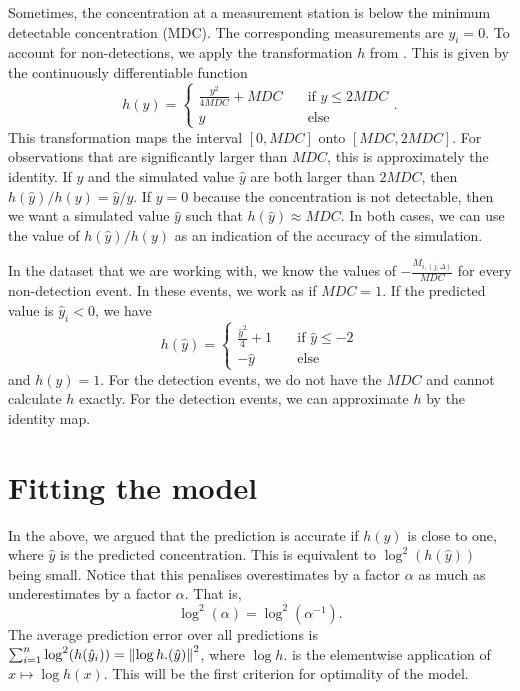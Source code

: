 \documentclass{article}
\begin{document}
Sometimes, the concentration at a measurement station is below the minimum detectable concentration (MDC). The corresponding measurements are $y_i = 0$.
To account for non-detections, we apply the transformation $h$ from \cite{deMeutter2022uncertainty}. This is given by the continuously differentiable function
$$
h(y) = \begin{cases}
    \frac{y^2}{4MDC} + MDC &\quad \text{if } y \le 2MDC \\
    y &\quad \text{else}
\end{cases}
.$$
This transformation maps the interval $[0, MDC]$ onto $[MDC, 2MDC]$. For observations that are significantly larger than $MDC$, this is approximately the identity. If $y$ and the simulated value $\hat{y}$ are both larger than $2MDC$, then $h(\hat{y}) / h(y) = \hat{y} / y$. If $y = 0$ because the concentration is not detectable, then we want a simulated value $\hat{y}$ such that $h(\hat{y}) \approx MDC$. In both cases, we can use the value of $h(\hat{y}) / h(y)$ as an indication of the accuracy of the simulation.


In the dataset that we are working with, we know the values of $- \frac{M_{i,(j,\Delta)}}{MDC}$ for every non-detection event. In these events, we work as if $MDC = 1$. If the predicted value is $\hat{y}_i < 0$, we have 
$$
h\left(\hat{y}\right) = \begin{cases}
    \frac{\hat{y}^2}{4} + 1 &\quad\text{if } \hat{y} \le -2 \\
    -\hat{y} &\quad\text{else}
\end{cases}
$$
and $h(y) = 1$. For the detection events, we do not have the $MDC$ and cannot calculate $h$ exactly. For the detection events, we can approximate $h$ by the identity map.

\section{Fitting the model}
\label{sec: optimisation}

In the above, we argued that the prediction is accurate if $h(\hat{y})$ is close to one, where $\hat{y}$ is the predicted concentration. This is equivalent to $\log^2(h(\hat{y}))$ being small. Notice that this penalises overestimates by a factor $\alpha$ as much as underestimates by a factor $\alpha$. That is, 
$$
\log^2(\alpha) = \log^2(\alpha^{-1})
.$$
The average prediction error over all predictions is $\sum_{i=1}^n \log^2(h(\hat{y}_i)) = \norm{\log h.(\hat{y})}^2$, where $\log h.$ is the elementwise application of $x \mapsto \log h(x)$. This will be the first criterion for optimality of the model.
\end{document}
